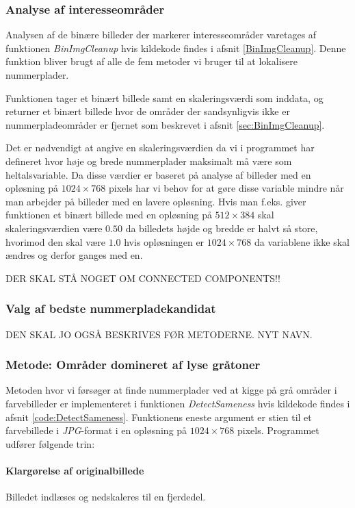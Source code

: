 \subsubsection{Analyse af interesseområder}
\label{sec:imp:BinImgCleanup}
Analysen af de binære billeder der markerer interesseområder varetages af funktionen \textit{BinImgCleanup} hvis kildekode findes i afsnit \vref{BinImgCleanup}. Denne funktion bliver brugt af alle de fem metoder vi bruger til at lokalisere nummerplader.

Funktionen tager et binært billede samt en skaleringsværdi som inddata, og returner et binært billede hvor de områder der sandsynligvis ikke er nummerpladeområder er fjernet som beskrevet i afsnit \vref{sec:BinImgCleanup}.

Det er nødvendigt at angive en skaleringsværdien da vi i programmet har defineret hvor høje og brede nummerplader maksimalt må være som heltalsvariable. Da disse værdier er baseret på analyse af billeder med en opløsning på $1024 \times 768$ pixels har vi behov for at gøre disse variable mindre når man arbejder på billeder med en lavere opløsning. Hvis man f.eks. giver funktionen et binært billede med en opløsning på $512 \times 384$ skal skaleringsværdien være $0.50$ da billedets højde og bredde er halvt så store, hvorimod den skal være $1.0$ hvis opløsningen er $1024 \times 768$ da variablene ikke skal ændres og derfor ganges med en.

DER SKAL STÅ NOGET OM CONNECTED COMPONENTS!!

\subsubsection{Valg af bedste nummerpladekandidat}
\label{sec:imp:GetBestCandidate}
DEN SKAL JO OGSÅ BESKRIVES FØR METODERNE.
NYT NAVN.


\subsubsection{Metode: Områder domineret af lyse gråtoner}
Metoden hvor vi førsøger at finde nummerplader ved at kigge på grå områder i farvebilleder er implementeret i funktionen \textit{DetectSameness} hvis kildekode findes i afsnit \vref{code:DetectSameness}. Funktionens eneste argument er stien til et farvebillede i \textit{JPG}-format i en opløsning på $1024 \times 768$ pixels. Programmet udfører følgende trin:

\paragraph{Klargørelse af originalbillede}
Billedet indlæses og nedskaleres til en fjerdedel. 

